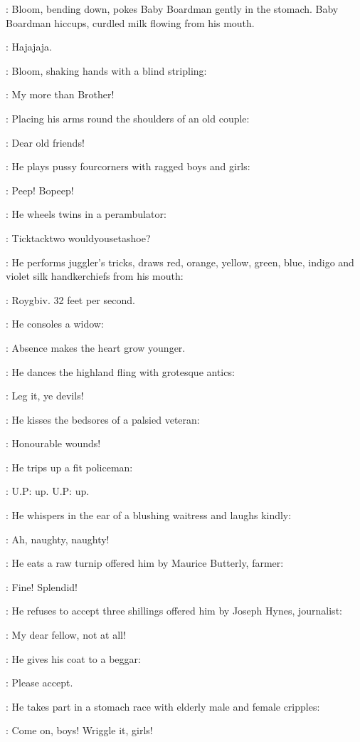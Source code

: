 :
Bloom, bending down, pokes Baby Boardman gently in the stomach.
Baby Boardman hiccups, curdled milk flowing from his mouth.

\BabyBoardman:
Hajajaja.

:
Bloom, shaking hands with a blind stripling:

\Bloom:
My more than Brother!

:
Placing his arms round the shoulders of an old couple:

\Bloom:
Dear old friends!

:
He plays pussy fourcorners with ragged boys and girls:

\Bloom:
Peep! Bopeep!

:
He wheels twins in a perambulator:

\Bloom:
Ticktacktwo wouldyousetashoe?

:
He performs juggler's tricks, draws red, orange, yellow,
green, blue, indigo and violet silk handkerchiefs from his mouth:

\Bloom:
Roygbiv.
32 feet per second.

:
He consoles a widow:

\Bloom:
Absence makes the heart grow younger.

:
He dances the highland fling with grotesque antics:

\Bloom:
Leg it, ye devils!

:
He kisses the bedsores of a palsied veteran:

\Bloom:
Honourable wounds!

:
He trips up a fit policeman:

\Bloom:
U.P: up.
U.P: up.

:
He whispers in the ear of a blushing waitress and laughs kindly:

\Bloom:
Ah, naughty, naughty!

:
He eats a raw turnip offered him by Maurice Butterly, farmer:

\Bloom:
Fine! Splendid!

:
He refuses to accept three shillings offered him by Joseph Hynes, journalist:

\Bloom:
My dear fellow, not at all!

:
He gives his coat to a beggar:

\Bloom:
Please accept.

:
He takes part in a stomach race with elderly male and female cripples:

\Bloom:
Come on, boys!
Wriggle it, girls!

